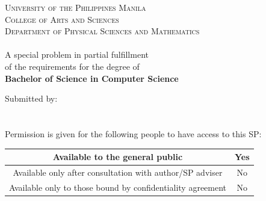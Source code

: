 \begin{titlepage}

\begin{center}



\textsc{\large University of the Philippines Manila}\\
\textsc{\large College of Arts and Sciences}\\
\textsc{\large Department of Physical Sciences and Mathematics}\\[3.5cm]

\textsc{\Large \MyTitle}\\[3.5cm]

A special problem in partial fulfillment\\
of the requirements for the degree of\\
\textbf{Bachelor of Science in Computer Science}


\vfill

Submitted by:\\[1.25cm]
\MyAuthor\\
{\MyDate}
\\[1cm]
Permission is given for the following people to have access to this SP:
\\[0.5cm]
\begin{tabular}{|c|c|}
	\hline
	Available to the general public & Yes \\
	\hline	
	Available only after consultation with author/SP adviser & No \\
	\hline
	Available only to those bound by confidentiality agreement & No \\
	\hline
\end{tabular}

\end{center}

\end{titlepage}